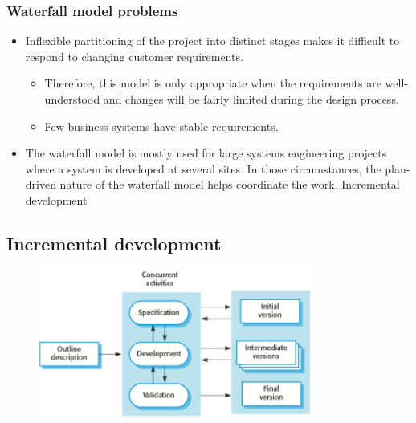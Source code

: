 \subsubsection{Waterfall model problems}
\begin{itemize}
  \item Inflexible partitioning of the project into distinct stages makes it difficult to respond to changing customer requirements.
  \begin{itemize}
    \item Therefore, this model is only appropriate when the requirements are well-understood and changes will be fairly limited during the design process.
    \item Few business systems have stable requirements.
  \end{itemize}

  \item The waterfall model is mostly used for large systems engineering projects where a system is developed at several sites.
  \newline
  In those circumstances, the plan-driven nature of the waterfall model helps coordinate the work.
  Incremental development

\end{itemize}
\subsection{Incremental development}
\begin{figure}[h!]
    \centering
    \includegraphics[width = 0.8\textwidth]{./figures/Incrementaldevelopment_L1_2.png}
    \caption{}
    \label{fig:L1_2}
\end{figure}

